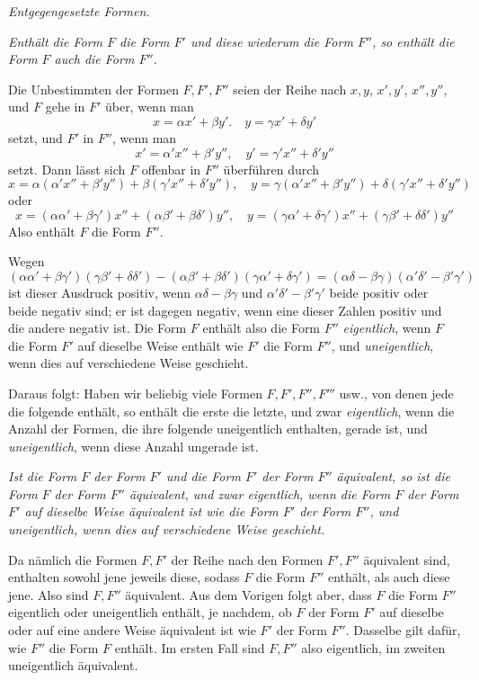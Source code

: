 \begin{center}
\textit{Entgegengesetzte Formen.}
\end{center}

\textit{Enthält die Form $F$ die Form $F'$ und diese wiederum die Form $F''$, so enthält die Form $F$ auch die Form $F''$.}

Die Unbestimmten der Formen $F,F',F''$ seien der Reihe nach $x,y$, $x',y'$, $x'',y''$, und $F$ gehe in $F'$ über, wenn man
\[
x=\alpha x'+\beta y'.\quad y=\gamma x'+\delta y'
\]
setzt, und $F'$ in $F''$, wenn man
\[
x'=\alpha'x''+\beta'y'',\quad y'=\gamma'x''+\delta'y''
\]
setzt. Dann lässt sich $F$ offenbar in $F''$ überführen durch
\[
x=\alpha(\alpha'x''+\beta'y'')+\beta(\gamma'x''+\delta'y''),\quad
y=\gamma(\alpha'x''+\beta'y'')+\delta(\gamma'x''+\delta'y'')
\]
oder
\[
x=(\alpha\alpha'+\beta\gamma')x''+(\alpha\beta'+\beta\delta')y'',\quad
y=(\gamma\alpha'+\delta\gamma')x''+(\gamma\beta'+\delta\delta')y''
\]
Also enthält $F$ die Form $F''$.

Wegen
\[
(\alpha\alpha'+\beta\gamma')(\gamma\beta'+\delta\delta')
 -(\alpha\beta'+\beta\delta')(\gamma\alpha'+\delta\gamma')
 =(\alpha\delta-\beta\gamma)(\alpha'\delta'-\beta'\gamma')
\]
ist dieser Ausdruck positiv, wenn $\alpha\delta-\beta\gamma$ und $\alpha'\delta'-\beta'\gamma'$ beide positiv oder beide negativ sind; er ist dagegen negativ, wenn eine dieser Zahlen positiv und die andere negativ ist. Die Form $F$ enthält also die Form $F''$ \textit{eigentlich}, wenn $F$ die Form $F'$ auf dieselbe Weise enthält wie $F'$ die Form $F''$, und \textit{uneigentlich}, wenn dies auf verschiedene Weise geschieht.

Daraus folgt: Haben wir beliebig viele Formen $F,F',F'',F'''$ usw., von denen jede die folgende enthält, so enthält die erste die letzte, und zwar \textit{eigentlich}, wenn die Anzahl der Formen, die ihre folgende uneigentlich enthalten, gerade ist, und \textit{uneigentlich}, wenn diese Anzahl ungerade ist.

\textit{Ist die Form $F$ der Form $F'$ und die Form $F'$ der Form $F''$ äquivalent, so ist die Form $F$ der Form $F''$ äquivalent, und zwar eigentlich, wenn die Form $F$ der Form $F'$ auf dieselbe Weise äquivalent ist wie die Form $F'$ der Form $F''$, und uneigentlich, wenn dies auf verschiedene Weise geschieht.}

Da nämlich die Formen $F,F'$ der Reihe nach den Formen $F',F''$ äquivalent sind, enthalten sowohl jene jeweils diese, sodass $F$ die Form $F''$ enthält, als auch diese jene. Also sind $F,F''$ äquivalent. Aus dem Vorigen folgt aber, dass $F$ die Form $F''$ eigentlich oder uneigentlich enthält, je nachdem, ob $F$ der Form $F'$ auf dieselbe oder auf eine andere Weise äquivalent ist wie $F'$ der Form $F''$. Dasselbe gilt dafür, wie $F''$ die Form $F$ enthält. Im ersten Fall sind $F,F''$ also eigentlich, im zweiten uneigentlich äquivalent.

